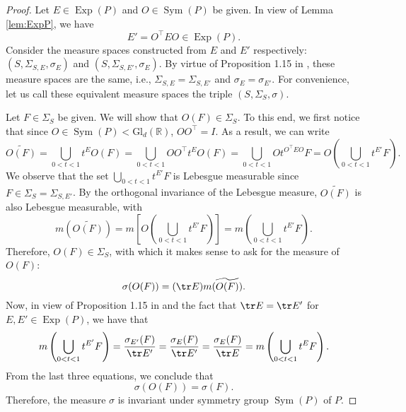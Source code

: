 \documentclass{article}
\theoremstyle{definition}
\newcommand\GldR{\mbox{Gl}_d(\mathbb{R})}
\newcommand\Sym{\operatorname{Sym}}
\newcommand\Exp{\operatorname{Exp}}
\newcommand{\lp}{\left(}
\newcommand{\rp}{\right)}
\newcommand{\lb}{\left[}
\newcommand{\rb}{\right]}
\theoremstyle{theorem}
\begin{document}
\begin{proof}
Let $E\in \Exp(P)$ and $O\in \Sym(P)$ be given. In view of Lemma \ref{lem:ExpP}, we have 
\begin{equation*}
    E' = O^\top E O \in \Exp(P).
\end{equation*}
Consider the measure spaces constructed from $E$ and $E'$ respectively: $(S, \Sigma_{S,E},\sigma_E)$ and $(S,\Sigma_{S,E'},\sigma_E)$. By virtue of Proposition 1.15 in \cite{RandlesBui2020}, these measure spaces are the same, i.e., $\Sigma_{S,E} = \Sigma_{S,E'}$ and $\sigma_{E} = \sigma_{E'}$. For convenience, let us call these equivalent measure spaces the triple $(S,\Sigma_S,\sigma)$. 

Let $F\in \Sigma_S$ be given. We will show that $O(F)\in \Sigma_S$. To this end, we first notice that since $O\in \Sym(P) < \GldR{}$, $OO^\top = I$. As a result, we can write
\begin{equation*}
    \widetilde{O(F)} = \bigcup_{0<t<1}t^E O(F) = \bigcup_{0<t<1} OO^\top t^E O(F) = \bigcup_{0<t<1}O t^{O^\top E O} F = O\lp \bigcup_{0<t<1}t^{E'} F\rp.
\end{equation*}
We observe that the set $\bigcup_{0<t<1} t^{E'}F$ is Lebesgue measurable since $F\in \Sigma_S = \Sigma_{S,E'}$. By the orthogonal invariance of the Lebesgue measure, $\widetilde{O(F)}$ is also Lebesgue measurable, with
\begin{equation*}
    m (\widetilde{O(F)} ) = m\lb O \lp \bigcup_{0<t<1}t^{E'}F \rp \rb =  m\lp \bigcup_{0<t<1}t^{E'}F \rp.
\end{equation*}
Therefore, $O(F)\in \Sigma_S$, with which it makes sense to ask for the measure of $O(F)$:
\begin{equation*}
    \sigma(O(F)) = (\tr E)m(\widetilde{O(F)}).
\end{equation*}
Now, in view of Proposition 1.15 in \cite{RandlesBui2020} and the fact that $\tr E = \tr E'$ for $E,E'\in \Exp(P)$, we have that
\begin{equation*}
    m\lp \bigcup_{0<t<1}t^{E'}F \rp = \frac{\sigma_{E'}(F)}{\tr E' }  
    = 
    \frac{\sigma_E(F)}{\tr E'} =  \frac{\sigma_E(F)}{\tr E}   = m\lp \bigcup_{0<t<1} t^E F  \rp.
\end{equation*}
From the last three equations, we conclude that 
\begin{equation*}
    \sigma(O(F)) = \sigma(F).
\end{equation*}
Therefore, the measure $\sigma$ is invariant under symmetry group $\Sym(P)$ of $P$.  
\end{proof}
\end{document}

